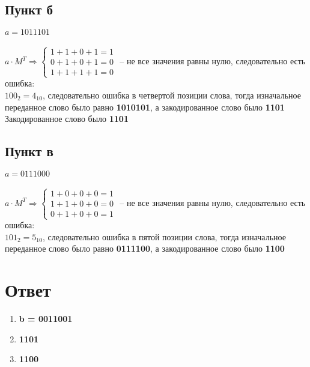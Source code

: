 \documentclass{article}
\begin{document}
\subsection*{Пункт б}
$a = 1011101$\\\\
$a \cdot M^T \Rightarrow
\begin{cases}
    1 + 1 + 0 + 1 = 1 \\
    0 + 1 + 0 + 1 = 0 \\
    1 + 1 + 1 + 1 = 0
\end{cases}
$
-- не все значения равны нулю, следовательно есть ошибка:\\
$100_2 = 4_{10}$, следовательно ошибка в четвертой позиции слова, тогда
изначальное переданное слово было равно \textbf{1010101}, а закодированное
слово было \textbf{1101}
\\
Закодированное слово было \textbf{1101}

\subsection*{Пункт в}
$a = 0111000$
\\\\
$a \cdot M^T \Rightarrow
\begin{cases}
    1 + 0 + 0 + 0 = 1 \\
    1 + 1 + 0 + 0 = 0 \\
    0 + 1 + 0 + 0 = 1
\end{cases}
$
-- не все значения равны нулю, следовательно есть ошибка:\\
$101_2 = 5_{10}$, следовательно ошибка в пятой позиции слова, тогда
изначальное переданное слово было равно \textbf{0111100}, а закодированное
слово было \textbf{1100}
\section*{Ответ}
\begin{enumerate}
    \item \textbf{b = 0011001}
    \item \textbf{1101}
    \item \textbf{1100} 
\end{enumerate}
\end{document}
